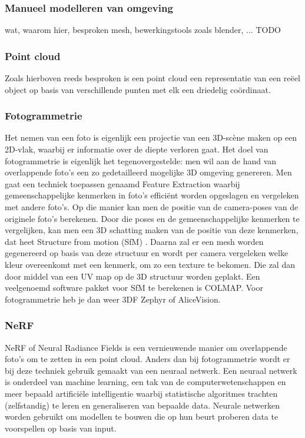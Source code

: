 \subsubsection{Manueel modelleren van omgeving}
wat, waarom hier, besproken mesh, bewerkingstools zoals blender, ... TODO

\subsubsection{Point cloud }
Zoals hierboven reeds besproken is een point cloud een representatie van een reëel object op basis van verschillende punten met elk een driedelig coördinaat.


\subsubsection{Fotogrammetrie}

Het nemen van een foto is eigenlijk een projectie van een 3D-scène maken op een 2D-vlak, waarbij er informatie over de diepte verloren gaat. Het doel van fotogrammetrie is eigenlijk het tegenovergestelde: men wil aan de hand van overlappende foto’s een zo gedetailleerd mogelijke 3D omgeving genereren. \autocite{FormLabs}
Men gaat een techniek toepassen genaamd Feature Extraction waarbij gemeenschappelijke kenmerken in foto’s efficiënt worden opgeslagen en vergeleken met andere foto’s. Op die manier kan men de positie van de camera-poses van de originele foto’s berekenen. Door die poses en de gemeenschappelijke kenmerken te vergelijken, kan men een 3D schatting maken van de positie van deze kenmerken, dat heet Structure from motion (SfM) \autocite{Schonberger2016}. Daarna zal er een mesh worden gegenereerd op basis van deze structuur en wordt per camera vergeleken welke kleur overeenkomt met een kenmerk, om zo een texture te bekomen. Die zal dan door middel van een UV map op de 3D structuur worden geplakt. Een veelgenoemd software pakket voor SfM te berekenen is COLMAP. Voor fotogrammetrie heb je dan weer 3DF Zephyr of AliceVision.

\subsubsection{NeRF}

NeRF of Neural Radiance Fields is een vernieuwende manier om overlappende foto’s om te zetten in een point cloud. Anders dan bij fotogrammetrie wordt er bij deze techniek gebruik gemaakt van een neuraal netwerk.
Een neuraal netwerk is onderdeel van machine learning, een tak van de computerwetenschappen en meer bepaald artificiële intelligentie waarbij statistische algoritmes trachten (zelfstandig)  te leren en generaliseren van bepaalde data. Neurale netwerken worden gebruikt om modellen te bouwen die op hun beurt proberen data te voorspellen op basis van input.


